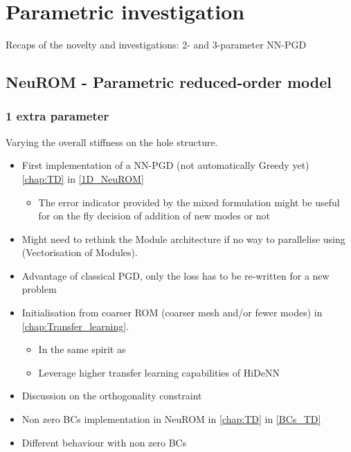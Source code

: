 \chapter[The 29$^{\text{th}}$ of February 2024 - Parametric investigation]{Parametric investigation}
\begin{chapabstract}
    Recaps of the novelty and investigations: 2- and 3-parameter NN-PGD
\end{chapabstract}

\minitoc

\section{NeuROM - Parametric reduced-order model}
\subsection{1 extra parameter}
Varying the overall stiffness on the hole structure.
\begin{itemize}
    \item First implementation of a NN-PGD (not automatically Greedy yet) \cref{chap:TD} in \cref{1D_NeuROM}
    \begin{itemize}
        \item The error indicator provided by the mixed formulation might be useful for on the fly decision of addition of new modes or not
    \end{itemize}
    \item Might need to rethink the Module architecture if no way to parallelise using  (Vectorisation of Modules).
    \item Advantage of classical PGD, only the loss has to be re-written for a new problem
    \item Initialisation from coarser ROM (coarser mesh and/or fewer modes) in \cref{chap:Transfer_learning}.
    \begin{itemize}
        \item In the same spirit as \cite{giacoma_toward_2015}
        \item Leverage higher transfer learning capabilities of HiDeNN
    \end{itemize}
    \item Discussion on the orthogonality constraint 
    \item Non zero BCs implementation in NeuROM in \cref{chap:TD} in \cref{BCs_TD}
    \item Different behaviour with non zero BCs
\end{itemize}

